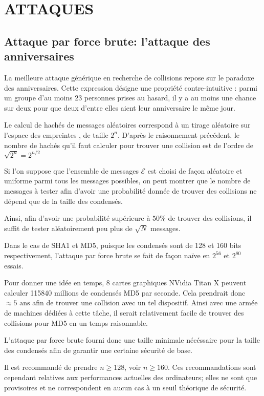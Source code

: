 \documentclass[10.5pt, a4paper, twoside, openright]{report}
\begin{document}
\chapter{ATTAQUES}
\section{Attaque par force brute: l’attaque des anniversaires}
La meilleure attaque générique en recherche de collisions repose sur le paradoxe des anniversaires. Cette expression désigne une propriété contre-intuitive : parmi un groupe d’au moins 23 personnes prises au hasard, il y a au moins une chance sur deux pour que deux d’entre elles aient leur anniversaire le même jour. 

Le calcul de hachés de messages aléatoires correspond à un tirage aléatoire sur l’espace des empreintes , de taille $2^n$. D’après le raisonnement précédent, le nombre de hachés qu’il faut calculer pour trouver une collision est de l’ordre de $\sqrt{2^n} = 2^{n/2}$

Si l'on suppose que l'ensemble de messages $\mathcal{E}$ est choisi de façon aléatoire et uniforme parmi tous les messages possibles, on peut montrer que le nombre de messages à tester afin d'avoir une probabilité donnée de trouver des collisions ne dépend que de la taille des condensés.

Ainsi, afin d'avoir une probabilité supérieure à $50\%$ de trouver des collisions, il suffit de tester aléatoirement peu plus de $\sqrt{N}$ messages.

Dans le cas de SHA1 et MD5, puisque les condensés sont de 128 et 160 bits respectivement, l'attaque par force brute se fait de façon naïve en $2^56$ et $2^80$ essais.

Pour donner une idée en temps, 8 cartes graphiques NVidia Titan X peuvent calculer 115840 millions de condensés MD5 par seconde. Cela prendrait donc $ \approx 5 \mbox{ ans}$ afin de trouver une collision avec un tel dispositif.
Ainsi avec une armée de machines dédiées à cette tâche, il serait relativement facile de trouver des collisions pour MD5 en un temps raisonnable.

L'attaque par force brute fourni donc une taille minimale nécéssaire pour la taille des condensés afin de garantir une certaine sécurité de base.

Il est recommandé de prendre $n \ge 128$, voir $n\ge 160$. Ces recommandations sont cependant relatives aux performances actuelles des ordinateurs; elles ne sont que provisoires et ne correspondent en aucun cas à un seuil théorique de sécurité.
\end{document}
